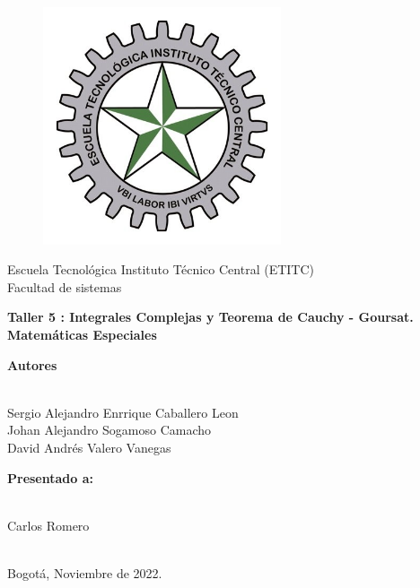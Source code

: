 \documentclass[a4paper,11pt,openany]{book}
\begin{document}
\begin{titlepage}
 
\begin{center}
\vspace*{-1in}
\begin{figure}[htb]
\begin{center}
\includegraphics[width=7cm]{ETITC.png}
\end{center}
\end{figure}
 
 
{\sc \huge Escuela Tecnológica Instituto Técnico Central (ETITC)}\\
\vspace*{0.15in}
Facultad de sistemas\\
\vspace*{0.6in}
\begin{Large}
\textbf{Taller 5 : Integrales Complejas y Teorema de Cauchy - Goursat.} \\
\textbf{Matem{\'a}ticas Especiales}\\
\end{Large}
\vspace*{0.3in}
\begin{large}
{\bf Autores} \\
 
\ 
 
Sergio Alejandro Enrrique Caballero Leon\\ 
Johan Alejandro Sogamoso Camacho \\
David Andrés Valero Vanegas \\
\end{large}
\vspace*{0.3in}
 
\end{center}
 
\begin{center}
{\bf Presentado a:} \\
 
\ 
 
Carlos Romero \\
 
\
 
Bogot{\'a}, Noviembre de 2022.
\end{center}
 
\end{titlepage}
\end{document}
